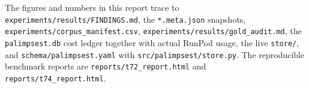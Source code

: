 The figures and numbers in this report trace to
\texttt{experiments/results/FINDINGS.md}, the \texttt{*.meta.json}
snapshots, \texttt{experiments/corpus\_manifest.csv},
\texttt{experiments/results/gold\_audit.md}, the \texttt{palimpsest.db}
cost ledger together with actual RunPod usage, the live \texttt{store/},
and \texttt{schema/palimpsest.yaml} with
\texttt{src/palimpsest/store.py}. The reproducible benchmark reports are
\texttt{reports/t72\_report.html} and \texttt{reports/t74\_report.html}.
